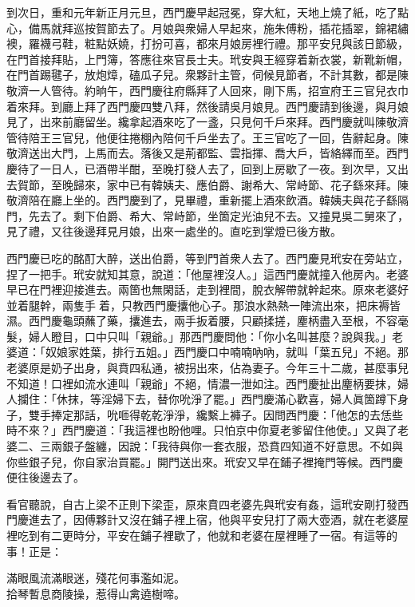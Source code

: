 到次日，重和元年新正月元旦，西門慶早起冠冕，穿大紅，天地上燒了紙，吃了點心，備馬就拜巡按賀節去了。月娘與衆婦人早起來，施朱傅粉，插花插翠，錦裙繡襖，羅襪弓鞋，粧點妖嬈，打扮可喜，都來月娘房裡行禮。那平安兒與該日節級，在門首接拜貼，上門簿，答應往來官長士夫。玳安與王經穿着新衣裳，新靴新帽，在門首踢毽子，放炮𤍤，磕瓜子兒。衆夥計主管，伺候見節者，不計其數，都是陳敬濟一人管待。{}約晌午，西門慶往府縣拜了人回來，剛下馬，招宣府王三官兒衣巾着來拜。到廳上拜了西門慶四雙八拜，然後請吳月娘見。西門慶請到後邊，與月娘見了，出來前廳留坐。纔拿起酒來吃了一盞，只見何千戶來拜。西門慶就叫陳敬濟管待陪王三官兒，他便往捲棚內陪何千戶坐去了。王三官吃了一回，告辭起身。陳敬濟送出大門，上馬而去。落後又是荊都監、雲指揮、喬大戶，皆絡繹而至。西門慶待了一日人，已酒帶半酣，至晚打發人去了，回到上房歇了一夜。到次早，又出去賀節，至晚歸來，家中已有韓姨夫、應伯爵、謝希大、常峙節、花子繇來拜。陳敬濟陪在廳上坐的。西門慶到了，見畢禮，重新擺上酒來飲酒。韓姨夫與花子繇隔門，先去了。剩下伯爵、希大、常峙節，坐箇定光油兒不去。{}又撞見吳二舅來了，見了禮，又往後邊拜見月娘，出來一處坐的。直吃到掌燈已後方散。

西門慶已吃的酩酊大醉，送出伯爵，等到門首衆人去了。西門慶見玳安在旁站立，捏了一把手。玳安就知其意，說道：「他屋裡沒人。」這西門慶就撞入他房內。老婆早已在門裡迎接進去。{}兩箇也無閑話，走到裡間，脫衣解帶就幹起來。原來老婆好並着腿幹，兩隻手𢵞着，只教西門慶攮他心子。那浪水熱熱一陣流出來，把床褥皆濕。西門慶龜頭蘸了藥，攮進去，兩手扳着腰，只顧揉搓，麈柄盡入至根，不容毫髮，婦人瞪目，口中只叫「親爺。」那西門慶問他：「你小名叫甚麼？說與我。」老婆道：「奴娘家姓葉，排行五姐。」西門慶口中喃喃吶吶，就叫「葉五兒」不絕。那老婆原是奶子出身，與賁四私通，被拐出來，佔為妻子。今年三十二歲，甚麼事兒不知道！口裡如流水連叫「親爺」不絕，情濃一泄如注。西門慶扯出麈柄要抹，婦人攔住：「休抹，等淫婦下去，替你吮淨了罷。」西門慶滿心歡喜，婦人眞箇蹲下身子，雙手捧定那話，吮咂得乾乾淨淨，纔繫上褲子。因問西門慶：「他怎的去恁些時不來？」西門慶道：「我這裡也盼他哩。只怕京中你夏老爹留住他使。」又與了老婆二、三兩銀子盤纏，因說：「我待與你一套衣服，恐賁四知道不好意思。不如與你些銀子兒，你自家治買罷。」開門送出來。玳安又早在鋪子裡掩門等候。西門慶便往後邊去了。

看官聽說，自古上梁不正則下梁歪，原來賁四老婆先與玳安有姦，這玳安剛打發西門慶進去了，因傅夥計又沒在鋪子裡上宿，他與平安兒打了兩大壺酒，就在老婆屋裡吃到有二更時分，平安在鋪子裡歇了，他就和老婆在屋裡睡了一宿。有這等的事！正是：

\begin{myquote}
滿眼風流滿眼迷，殘花何事濫如泥。\\拾琴暫息商陵操，惹得山禽遶樹啼。
\end{myquote}


